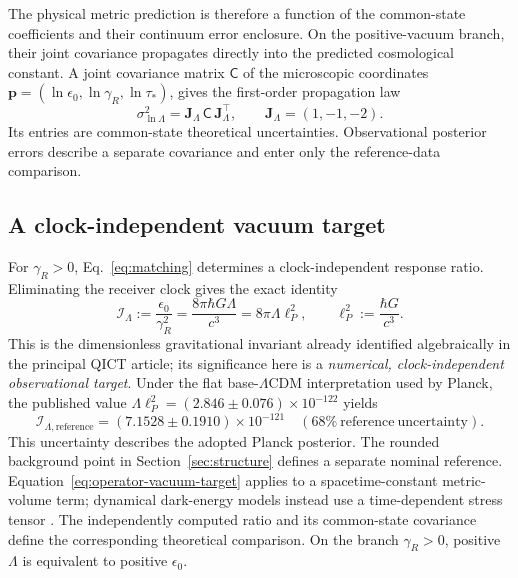 \noindent The physical metric prediction is therefore a function of the common-state coefficients and their continuum error enclosure. On the positive-vacuum branch, their joint covariance propagates directly into the predicted cosmological constant.
A joint covariance matrix $\mathsf C$ of the microscopic coordinates $\bm p=(\ln\epsilon_0,\ln\gamma_R,\ln\tau_*)$, gives the first-order propagation law
\begin{equation}
\sigma_{\ln\Lambda}^2=\bm J_\Lambda\,\mathsf C\,\bm J_\Lambda^\top,
\qquad \bm J_\Lambda=(1,-1,-2).
\end{equation}
Its entries are common-state theoretical uncertainties. Observational posterior errors describe a separate covariance and enter only the reference-data comparison.

\subsection{A clock-independent vacuum target}

For $\gamma_R>0$, Eq.~\eqref{eq:matching} determines a clock-independent response ratio. Eliminating the receiver clock gives the exact identity
\begin{equation}\label{eq:operator-vacuum-invariant}
\boxed{\mathcal I_\Lambda:=\frac{\epsilon_0}{\gamma_R^2}
=\frac{8\pi\hbar G\Lambda}{c^3}=8\pi\Lambda\ell_P^2,\qquad
\ell_P^2:=\frac{\hbar G}{c^3}.}
\end{equation}
This is the dimensionless gravitational invariant already identified algebraically in the principal QICT article; its significance here is a \emph{numerical, clock-independent observational target}. Under the flat base-$\Lambda$CDM interpretation used by Planck, the published value $\Lambda\ell_P^2=(2.846\pm0.076)\times10^{-122}$ yields
\begin{equation}\label{eq:operator-vacuum-target}
\boxed{\mathcal I_{\Lambda,\mathrm{reference}}=(7.1528\pm0.1910)\times10^{-121}\quad(68\%\ \mathrm{reference\ uncertainty}).}
\end{equation}
This uncertainty describes the adopted Planck posterior. The rounded background point in Section~\ref{sec:structure} defines a separate nominal reference. Equation~\eqref{eq:operator-vacuum-target} applies to a spacetime-constant metric-volume term; dynamical dark-energy models instead use a time-dependent stress tensor \cite{Planck,DESI25}. The independently computed ratio and its common-state covariance define the corresponding theoretical comparison. On the branch $\gamma_R>0$, positive $\Lambda$ is equivalent to positive $\epsilon_0$.

